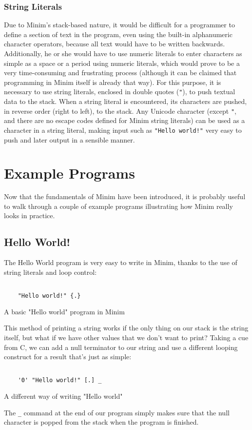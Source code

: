 \documentclass{article}
\begin{document}
\subsubsection{String Literals}
Due to Minim's stack-based nature, it would be difficult for a programmer to define a section of text in the program, even using the built-in alphanumeric character operators, because all text would have to be written backwards. Additionally, he or she would have to use numeric literals to enter characters as simple as a space or a period using numeric literals, which would prove to be a very time-consuming and frustrating process (although it can be claimed that programming in Minim itself is already that way). For this purpose, it is necessary to use string literals, enclosed in double quotes (\texttt{"}), to push textual data to the stack. When a string literal is encountered, its characters are pushed, in reverse order (right to left), to the stack. Any Unicode character (except \texttt{"}, and there are no escape codes defined for Minim string literals) can be used as a character in a string literal, making input such as \texttt{"Hello world!"} very easy to push and later output in a sensible manner.
\section{Example Programs}
Now that the fundamentals of Minim have been introduced, it is probably useful to walk through a couple of example programs illustrating how Minim really looks in practice.
\subsection{Hello World!}
The Hello World program is very easy to write in Minim, thanks to the use of string literals and loop control:
\begin{program}
	\begin{verbatim}
	
	"Hello world!" {.}
	\end{verbatim}
	\caption{A basic "Hello world" program in Minim}
\end{program}
This method of printing a string works if the only thing on our stack is the string itself, but what if we have other values that we don't want to print? Taking a cue from C, we can add a null terminator to our string and use a different looping construct for a result that's just as simple:
\begin{program}
	\begin{verbatim}
	
	'0' "Hello world!" [.] _
	\end{verbatim}
	\caption{A different way of writing "Hello world"}
\end{program}
The \texttt{\_} command at the end of our program simply makes sure that the null character is popped from the stack when the program is finished.
\end{document}
